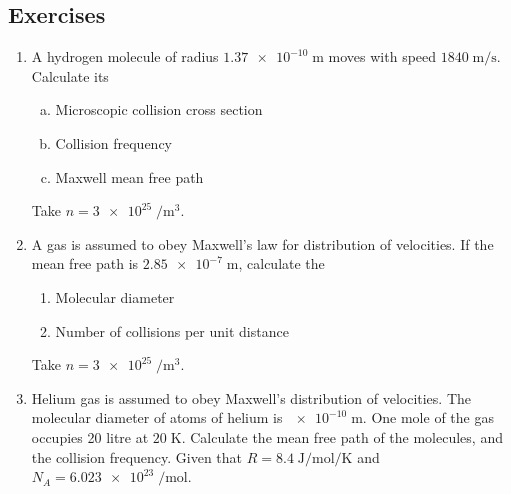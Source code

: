 	\subsection*{Exercises}
		\begin{enumerate}
			\item A hydrogen molecule of radius $\num{1.37e-10}\;\unit{\metre}$ moves with speed $1840\;\unit{\metre\per\second}$. Calculate its\vspace{-1.5ex}
			\begin{enumerate}[(a)]
				\item Microscopic collision cross section
				\item Collision frequency
				\item Maxwell mean free path
			\end{enumerate}\vspace{-1.5ex}
			Take $n=\num{3e25}\;\unit{\per\metre\cubed}$.
			
			\item A gas is assumed to obey Maxwell's law for distribution of velocities. If the mean free path is $\num{2.85e-7}\;\unit{\metre}$, calculate the\vspace{-1.5ex}
			\begin{enumerate}
				\item Molecular diameter
				\item Number of collisions per unit distance
			\end{enumerate}\vspace{-1.5ex}
			Take $n=\num{3e25}\;\unit{\per\metre\cubed}$.
			
			\item Helium gas is assumed to obey Maxwell's distribution of velocities. The molecular diameter of atoms of helium is $\num{e-10}\;\unit{\metre}$. One mole of the gas occupies 20 litre at $20\;\unit{\kelvin}$. Calculate the mean free path of the molecules, and the collision frequency. Given that $R=8.4\;\unit{\joule\per\mole\per\kelvin}$ and $N_A=\num{6.023e23}\;\unit{\per\mole}$.
		\end{enumerate}